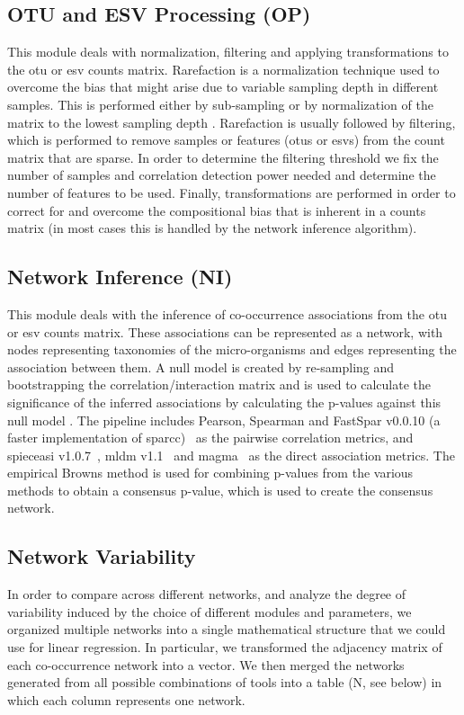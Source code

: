   \subsection*{OTU and ESV Processing (OP)}
  \vspace{-5mm}
  This module deals with normalization, filtering and applying transformations to the \ac{otu} or \ac{esv} counts matrix.
  Rarefaction is a normalization technique used to overcome the bias that might arise due to variable sampling depth in different samples.
  This is performed either by sub-sampling or by normalization of the matrix to the lowest sampling depth \cite{Weiss2015}.
  Rarefaction is usually followed by filtering, which is performed to remove samples or features (\ac{otu}s or \ac{esv}s) from the count matrix that are sparse.
  In order to determine the filtering threshold we fix the number of samples and correlation detection power needed and determine the number of features to be used.
  Finally, transformations are performed in order to correct for and overcome the compositional bias that is inherent in a counts matrix (in most cases this is handled by the network inference algorithm).

  \subsection*{Network Inference (NI)}
  \vspace{-5mm}
  This module deals with the inference of co-occurrence associations from the \ac{otu} or \ac{esv} counts matrix.
  These associations can be represented as a network, with nodes representing taxonomies of the micro-organisms and edges representing the association between them.
  A null model is created by re-sampling and bootstrapping the correlation/interaction matrix and is used to calculate the significance of the inferred associations by calculating the p-values against this null model \cite{Watts2018}.
  The pipeline includes Pearson, Spearman and FastSpar v0.0.10 (a faster implementation of \ac{sparcc})~\cite{Watts2018} as the pairwise correlation metrics, and \ac{spieceasi} v1.0.7~\cite{Kurtz2015}, \ac{mldm} v1.1~\cite{Yang2017} and \ac{magma}~\cite{Cougoul2019} as the direct association metrics.
  The empirical Browns method is used for combining p-values from the various methods to obtain a consensus p-value, which is used to create the consensus network.

  \subsection*{Network Variability}
  \vspace{-5mm}
 In order to compare across different networks, and analyze the degree of variability induced by the choice of different modules and parameters, we organized multiple networks into a single mathematical structure that we could use for linear regression.
 In particular, we transformed the adjacency matrix of each co-occurrence network into a vector.
 We then merged the networks generated from all possible combinations of tools into a table (N, see below) in which each column represents one network.
  
